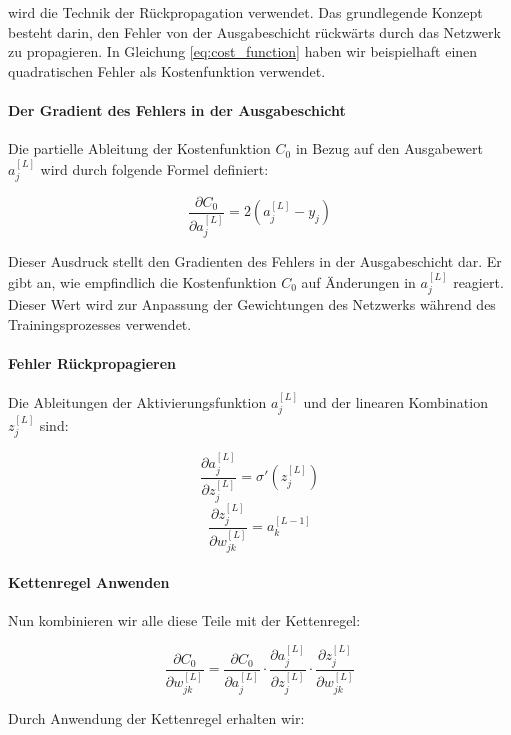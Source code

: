 wird die Technik der Rückpropagation verwendet. Das grundlegende Konzept besteht darin, den Fehler von der Ausgabeschicht rückwärts durch das Netzwerk zu propagieren. In Gleichung \ref{eq:cost_function} haben wir beispielhaft einen quadratischen Fehler als Kostenfunktion verwendet.

\cite{SuttonBarto2018}

\paragraph{Der Gradient des Fehlers in der Ausgabeschicht}

Die partielle Ableitung der Kostenfunktion \( C_0 \) in Bezug auf den Ausgabewert \( a_j^{[L]} \) wird durch folgende Formel definiert:

\begin{equation}
\label{eq:partial_derivative}
\frac{\partial C_0}{\partial a_j^{[L]}} = 2 \left( a_j^{[L]} - y_j \right)
\end{equation}

Dieser Ausdruck stellt den Gradienten des Fehlers in der Ausgabeschicht dar. Er gibt an, wie empfindlich die Kostenfunktion \( C_0 \) auf Änderungen in \( a_j^{[L]} \) reagiert. Dieser Wert wird zur Anpassung der Gewichtungen des Netzwerks während des Trainingsprozesses verwendet.

\paragraph{Fehler Rückpropagieren}

Die Ableitungen der Aktivierungsfunktion \( a_j^{[L]} \) und der linearen Kombination \( z_j^{[L]} \) sind:

\[
\frac{\partial a_j^{[L]}}{\partial z_j^{[L]}} = \sigma' \left( z_j^{[L]} \right)
\]
\[
\frac{\partial z_j^{[L]}}{\partial w_{jk}^{[L]}} = a_k^{[L-1]}
\]

\paragraph{Kettenregel Anwenden}

Nun kombinieren wir alle diese Teile mit der Kettenregel:

\[
\frac{\partial C_0}{\partial w_{jk}^{[L]}} = \frac{\partial C_0}{\partial a_j^{[L]}} \cdot \frac{\partial a_j^{[L]}}{\partial z_j^{[L]}} \cdot \frac{\partial z_j^{[L]}}{\partial w_{jk}^{[L]}}\]
\label{eq:Ketten Regel}

Durch Anwendung der Kettenregel erhalten wir:

